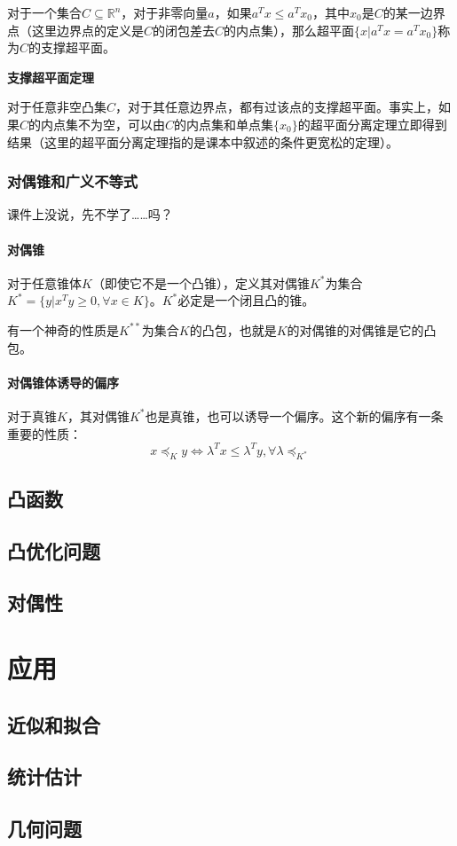 \documentclass[12pt,a4paper]{book}
\begin{document}
对于一个集合$C\subseteq\mathbb{R}^n$，对于非零向量$a$，如果$a^Tx\leq a^Tx_0$，其中$x_0$是$C$的某一边界点（这里边界点的定义是$C$的闭包差去$C$的内点集），那么超平面$\{x|a^Tx=a^Tx_0\}$称为$C$的支撑超平面。

\textbf{支撑超平面定理}

对于任意非空凸集$C$，对于其任意边界点，都有过该点的支撑超平面。事实上，如果$C$的内点集不为空，可以由$C$的内点集和单点集$\{x_0\}$的超平面分离定理立即得到结果（这里的超平面分离定理指的是课本中叙述的条件更宽松的定理）。

\section{对偶锥和广义不等式}

课件上没说，先不学了……吗？

\subsection{对偶锥}
对于任意锥体$K$（即使它不是一个凸锥），定义其对偶锥$K^*$为集合$K^*=\{y|x^Ty\geq 0 ,\forall x\in K\}$。$K^*$必定是一个闭且凸的锥。

有一个神奇的性质是$K^{**}$为集合$K$的凸包，也就是$K$的对偶锥的对偶锥是它的凸包。

\subsection{对偶锥体诱导的偏序}

对于真锥$K$，其对偶锥$K^*$也是真锥，也可以诱导一个偏序。这个新的偏序有一条重要的性质：
$$x\preceq_K y \Leftrightarrow \lambda^T x \leq \lambda^T y,\forall \lambda\preceq_{K^*}$$

\chapter{凸函数}
\chapter{凸优化问题}
\chapter{对偶性}

\part{应用}
\chapter{近似和拟合}
\chapter{统计估计}
\chapter{几何问题}




\printindex
\end{document}
